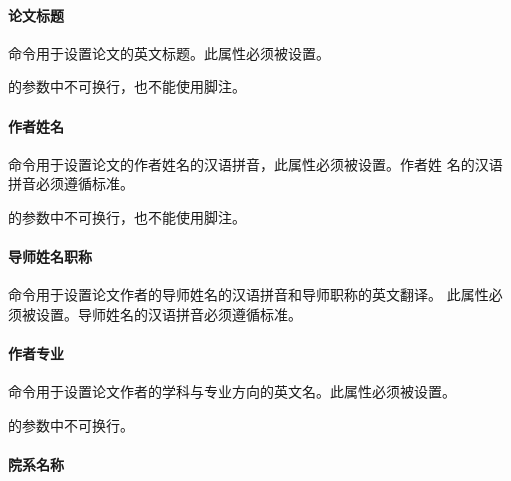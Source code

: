 \paragraph{论文标题}

命令用于设置论文的英文标题。此属性必须被设置。
\begin{tex}
\end{tex}
\begin{note}
的参数中不可换行，也不能使用脚注。
\end{note}

\paragraph{作者姓名}

命令用于设置论文的作者姓名的汉语拼音，此属性必须被设置。作者姓
名的汉语拼音必须遵循标准。
\begin{tex}
\end{tex}
\begin{note}
的参数中不可换行，也不能使用脚注。
\end{note}

\paragraph{导师姓名职称}

命令用于设置论文作者的导师姓名的汉语拼音和导师职称的英文翻译。
此属性必须被设置。导师姓名的汉语拼音必须遵循标准。
\begin{tex}
\end{tex}

\paragraph{作者专业}

命令用于设置论文作者的学科与专业方向的英文名。此属性必须被设置。
\begin{tex}
\end{tex}
\begin{note}
的参数中不可换行。
\end{note}

\paragraph{院系名称}

